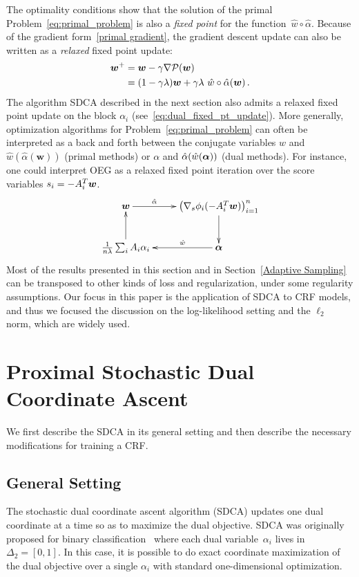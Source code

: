 The optimality conditions show that the solution of the primal Problem~\eqref{eq:primal_problem} is also a \emph{fixed point} for the function~$\hat w \circ \hat \alpha$.
Because of the gradient form~\eqref{primal gradient}, the gradient descent update can also be written as a \emph{relaxed} fixed point update:
\begin{align}
	\boldsymbol{w}^+
	& = \boldsymbol{w} - \gamma \nabla {\mathcal P}(\boldsymbol{w}) \\
	& = (1-\gamma \lambda) \boldsymbol{w}  + \gamma \lambda \,\, \hat w \circ \hat \alpha (\boldsymbol{w}) \, .
\end{align}
The algorithm SDCA described in the next section also admits a relaxed fixed point update on the block $\alpha_i$ (see~\eqref{eq:dual_fixed_pt_update}).
More generally, optimization algorithms for Problem~\eqref{eq:primal_problem} can often be interpreted as a back and forth between the conjugate variables $w$ and $\hat w(\hat \alpha(\bm w))$ (primal methods) or $\alpha$ and $\hat \alpha(\hat w( \boldsymbol{\alpha}))$ (dual methods).
For instance, one could interpret OEG as a relaxed fixed point iteration over the score variables $s_i = -A_i^T\boldsymbol{w}$.
\begin{displaymath}
	\xymatrix{
		\bm w \ar[r]^-{\hat{\alpha}}
		&   \left( \nabla_s \phi_i(-A_i^T \bm w) \right)_{i=1}^n \ar[d] \\
		\frac{1}{n \lambda} \sum_i A_i \alpha_i  \ar[u]
		&  \balpha \ar[l]_-{\hat{w}}
	}
\end{displaymath}
Most of the results presented in this section and in Section~\ref{Adaptive Sampling} can be transposed to other kinds of loss and regularization, under some regularity assumptions.
Our focus in this paper is the application of SDCA to CRF models, and thus we focused the discussion on the log-likelihood setting and the $\ell_2$ norm, which are widely used.


\section{Proximal Stochastic Dual Coordinate Ascent} \label{sec:SDCA}

We first describe the SDCA in its general setting and then describe the necessary modifications for training a CRF.

\subsection{General Setting}
The stochastic dual coordinate ascent algorithm (SDCA) updates one dual coordinate at a time so as to maximize the dual objective.
SDCA was originally proposed for binary classification~\citep{shalev-shwartz_stochastic_2013} where each dual variable~$\alpha_i$ lives in $\Delta_2 = [0,1]$.
In this case, it is possible to do exact coordinate maximization of the dual objective over a single $\alpha_i$ with standard one-dimensional optimization.

